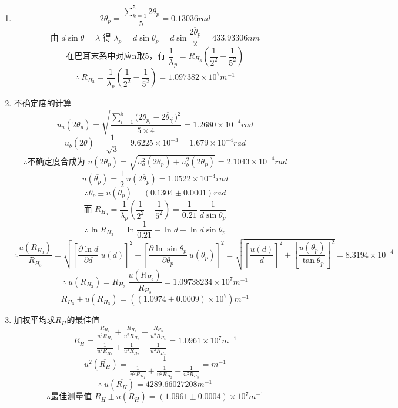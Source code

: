 \documentclass[11pt,a4paper,oneside]{article}
\begin{document}
\begin{enumerate}
  \item { }
      $$\overline{2{\theta}_p} = \displaystyle\frac{\sum_{k=1}^5 2{\theta}_p}{5} = 0.13036rad$$
      $$\displaystyle\text{由\ }d\sin{\theta} = {\lambda}\text{\ 得\ }{\lambda}_p = d\sin{\theta}_p = d\sin{\frac{\overline{2{\theta}_p}}{2}} = 433.93306nm$$
      $$\displaystyle\text{在巴耳末系中对应n取5，有\ }\frac{1}{\lambda}_p = R_{H_3}\left(\frac{1}{2^2}-\frac{1}{5^2}\right)$$
      $$\therefore\ \displaystyle R_{H_3} = \frac{1}{ {\lambda}_p}\left(\frac{1}{2^2}-\frac{1}{5^2}\right) = 1.097382{\times}10^{7}m^{-1}$$
  \item {不确定度的计算}
      $$u_a(\overline{2{\theta}_p}) = \displaystyle\sqrt{\frac{\sum_{i=1}^5{(2{\theta}_{p_{i}}-\overline{2{\theta}_{\gamma]}}})^2}{5\times4}}=1.2680{\times}10^{-4} rad$$
      $$u_b(\overline{2\theta}) = \displaystyle\frac{1}{\sqrt3} = 9.6225\times10^{-3} = 1.679 \times 10^{-4} rad$$
      $$\therefore\text{不确定度合成为\ }u(\overline{2{\theta}_p}) = \sqrt{u_a^2(\overline{2{\theta}_p})+u_b^2(\overline{2{\theta}_p})} = 2.1043{\times}10^{-4}rad$$
      $$u(\overline{ {\theta}_p})= \displaystyle\frac12\ u(\overline{2{\theta}_p}) = 1.0522{\times}10^{-4}rad$$
      $$\therefore{\theta}_p \pm u({\theta}_p) = (0.1304\pm0.0001)rad$$
      $$\text{而\ }\displaystyle R_{H_3} = \frac{1}{ {\lambda}_p}\left(\frac{1}{2^2}-\frac{1}{5^2}\right) = \frac{1}{0.21}\ \frac{1}{d\sin{\theta}_p}$$
      $$\therefore\ln{R_{H_3}} = \ln{\frac{1}{0.21}} -\ln{d} - \ln{d\sin{\theta}_p}$$
      $$\therefore\displaystyle \frac{u(R_{H_3})}{R_{H_3}} = \sqrt{ {\left[\frac{\partial{\ln{d}}}{\partial{d}}\ u(d)\right]}^2 + {\left[\frac{\partial{\ln{\sin{ {\theta}_p}}}}{\partial{ {\theta}_p}}\ u({\theta}_p)\right]}^2} = \sqrt{ {\left[\frac{u(d)}{d}\right]}^2 + {\left[\frac{u({\theta}_p)}{\tan{ {\theta}_p}}\right]}^2} = 8.3194{\times}10^{-4}$$
      $$\therefore \ u(R_{H_3}) = \displaystyle R_{H_3}\ \frac{u(R_{H_3})}{R_{H_3}} = 1.09738234{\times}10^{7}m^{-1}$$ 
      $$R_{H_3} \pm u(R_{H_3}) = ((1.0974\pm0.0009){\times}10^{7})m^{-1}$$
  \item{加权平均求$R_H$的最佳值}
      $$\overline{R_H} = \displaystyle\frac{\frac{R_{H_1}}{u^2{R_{H_1}}}+\frac{R_{H_2}}{u^2{R_{H_2}}}+\frac{R_{H_3}}{u^2{R_{H_3}}}}{\frac{1}{u^2{R_{H_1}}}+\frac{1}{u^2{R_{H_2}}}+\frac{1}{u^2{R_{H_3}}}} = 1.0961{\times}10^{7}m^{-1}$$
      $$u^2(\overline{R_H}) = \displaystyle\frac{1}{\frac{1}{u^2{R_{H_1}}}+\frac{1}{u^2{R_{H_2}}}+\frac{1}{u^2{R_{H_3}}}} = m^{-1}$$
      $$\therefore \ u(\overline{R_H}) = 4289.66027208m^{-1} $$
      $$\therefore\text{最佳测量值 \ } \overline{R_H} \pm u(\overline{R_H}) = (1.0961\pm0.0004){\times}10^{7} m^{-1}$$   
\end{enumerate}
\end{document}
